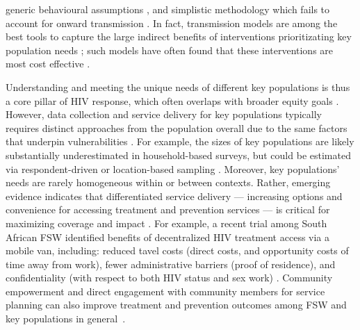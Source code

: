 generic behavioural assumptions \cite{Shubber2014}, and
simplistic methodology which fails to account for onward transmission \cite{Mishra2014mot}.
In fact, transmission models are among the best tools to capture the large indirect benefits of
interventions prioritizating key population needs \cite{Mishra2014mot,Long2021};
such models have often found that these interventions are most cost effective
\cite{Stuart2018,Maheu-Giroux2019,Johnson2019}.
\par
Understanding and meeting the unique needs of different key populations is thus
a core pillar of HIV response, which often overlaps with broader equity goals
\cite{Shannon2015,Beyrer2015,Beyrer2016}.
However, data collection and service delivery for key populations typically requires
distinct approaches from the population overall
due to the same factors that underpin vulnerabilities \cite{UNAIDS2010kps,WHO2016kp}.
For example, the sizes of key populations
are likely substantially underestimated in household-based surveys,
but could be estimated via respondent-driven or location-based sampling
\cite{UNAIDS2010kps,Lowndes2012,Abdul-Quader2014}.
Moreover, key populations' needs are rarely homogeneous within or between contexts.
Rather, emerging evidence indicates that differentiated service delivery
--- \ie increasing options and convenience for accessing treatment and prevention services ---
is critical for maximizing coverage and impact \cite{Grimsrud2016,Ehrenkranz2019,Huber2021}.
For example, a recent trial among South African FSW identified benefits of
decentralized HIV treatment access via a mobile van, including:
reduced tavel costs (direct costs, and opportunity costs of time away from work),
fewer administrative barriers (\eg proof of residence), and
confidentiality (with respect to both HIV status and sex work) \cite{Comins2022}.
Community empowerment and direct engagement with community members for service planning
can also improve treatment and prevention outcomes
among FSW and key populations in general~\cite{Atuhaire2021}.
